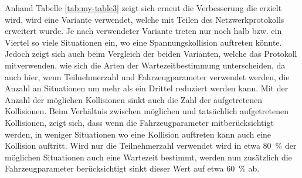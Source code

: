 Anhand Tabelle \ref{tab:my-table3} zeigt sich erneut die Verbesserung die erzielt wird, wird eine Variante verwendet, welche mit Teilen des Netzwerkprotokolls erweitert wurde. Je nach verwendeter Variante treten nur noch halb bzw. ein Viertel so viele Situationen ein, wo eine Spannungskollision auftreten könnte. Jedoch zeigt sich auch beim Vergleich der beiden Varianten, welche das Protokoll mitverwenden, wie sich die Arten der Wartezeitbestimmung unterscheiden, da auch hier, wenn Teilnehmerzahl und Fahrzeugparameter verwendet werden, die Anzahl an Situationen um mehr als ein Drittel reduziert werden kann. Mit der Anzahl der möglichen Kollisionen sinkt auch die Zahl der aufgetretenen Kollisionen. Beim Verhältnis zwischen möglichen und tatsächlich aufgetretenen Kollisionen, zeigt sich, dass wenn die Fahrzeugparameter mitberücksichtigt werden, in weniger Situationen wo eine Kollision auftreten kann auch eine Kollision auftritt. Wird nur die Teilnehmerzahl verwendet wird in etwa 80~\% der möglichen Situationen auch eine Wartezeit bestimmt, werden nun zusätzlich die Fahrzeugparameter berücksichtigt sinkt dieser Wert auf etwa 60~\% ab. 
